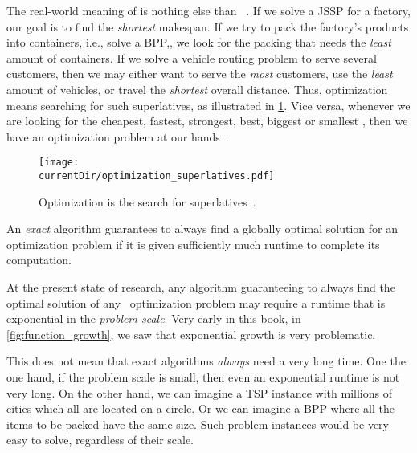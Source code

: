 The real-world meaning of  is nothing else than ~\cite{BB2009NO}.
If we solve a \gls{JSSP} for a factory, our goal is to find the \emph{shortest} makespan.
If we try to pack the factory's products into containers, i.e., solve a \gls{BPP},, we look for the packing that needs the \emph{least} amount of containers.
If we solve a vehicle routing problem to serve several customers, then we may either want to serve the \emph{most} customers, use the \emph{least} amount of vehicles, or travel the \emph{shortest} overall distance.
Thus, optimization means searching for such superlatives, as illustrated in \cref{fig:optimization_superlatives}.
Vice versa, whenever we are looking for the cheapest, fastest, strongest, best, biggest or smallest , then we have an optimization problem at our hands~\cite{KBBDCGJLMPQSVBY2016GLPFOR}.%
%
\begin{figure}%
\centering%
\texttt{[image: \\currentDir/optimization\_superlatives.pdf]}%
\caption{Optimization is the search for superlatives~\cite{BB2009NO}.}%
\label{fig:optimization_superlatives}%
\end{figure}%
\endhsection%
%
\begin{definition}%
An \emph{exact} algorithm guarantees to always find a globally optimal solution for an optimization problem if it is given sufficiently much runtime to complete its computation.%
\end{definition}%
%
At the present state of research, any algorithm guaranteeing to always find the optimal solution of any \NPhard\ optimization problem may require a runtime that is exponential in the \emph{problem scale}.
Very early in this book, in \cref{fig:function_growth}, we saw that exponential growth is very problematic.

This does not mean that exact algorithms \emph{always} need a very long time.
One the one hand, if the problem scale is small, then even an exponential runtime is not very long.
On the other hand, we can imagine a \gls{TSP} instance with millions of cities which all are located on a circle.
Or we can imagine a \gls{BPP} where all the items to be packed have the same size.
Such problem instances would be very easy to solve, regardless of their scale.

